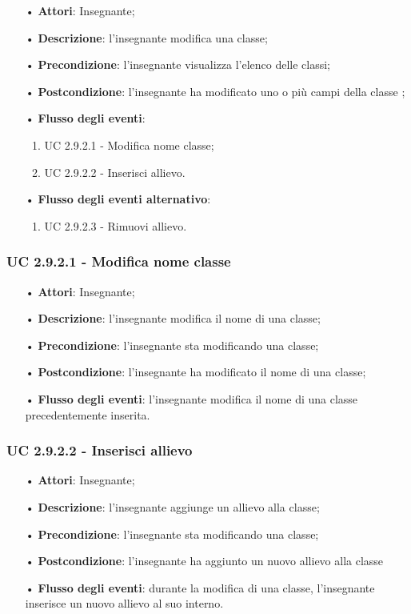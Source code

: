 \begin{itemize}
	\item[•] \textbf{Attori}: Insegnante;
	\item[•] \textbf{Descrizione}: l'insegnante modifica una classe;
	\item[•] \textbf{Precondizione}: l'insegnante visualizza l'elenco delle classi;
	\item[•] \textbf{Postcondizione}: l'insegnante ha modificato uno o più campi della classe ;
	\item[•] \textbf{Flusso degli eventi}:
	\begin{enumerate}
		\item UC 2.9.2.1 - Modifica nome classe;
		\item UC 2.9.2.2 - Inserisci allievo.
	\end{enumerate}
	\item[•] \textbf{Flusso degli eventi alternativo}:
	\begin{enumerate}
		\item UC 2.9.2.3 - Rimuovi allievo.
	\end{enumerate}
\end{itemize}

\subsubsection{UC 2.9.2.1 - Modifica nome classe}
\begin{itemize}
	\item[•] \textbf{Attori}: Insegnante;
	\item[•] \textbf{Descrizione}: l'insegnante modifica il nome di una classe;
	\item[•] \textbf{Precondizione}: l'insegnante sta modificando una classe;
	\item[•] \textbf{Postcondizione}: l'insegnante ha modificato il nome di una classe;
	\item[•] \textbf{Flusso degli eventi}: l'insegnante modifica il nome di una classe precedentemente inserita.
\end{itemize}

\subsubsection{UC 2.9.2.2 - Inserisci allievo}
\begin{itemize}
	\item[•] \textbf{Attori}: Insegnante;
	\item[•] \textbf{Descrizione}: l'insegnante aggiunge un allievo alla classe;
	\item[•] \textbf{Precondizione}: l'insegnante sta modificando una classe;
	\item[•] \textbf{Postcondizione}: l'insegnante ha aggiunto un nuovo allievo alla classe
	\item[•] \textbf{Flusso degli eventi}: durante la modifica di una classe, l'insegnante inserisce un nuovo allievo al suo interno.
\end{itemize}

